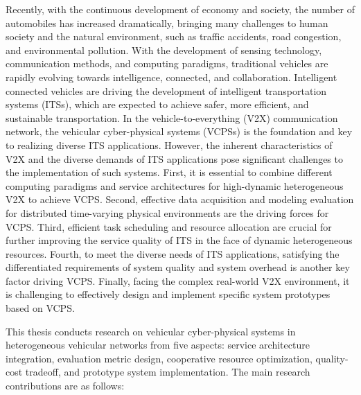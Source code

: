 \begin{eabstract}	%
Recently, with the continuous development of economy and society, the number of automobiles has increased dramatically, bringing many challenges to human society and the natural environment, such as traffic accidents, road congestion, and environmental pollution. 
With the development of sensing technology, communication methods, and computing paradigms, traditional vehicles are rapidly evolving towards intelligence, connected, and collaboration. 
Intelligent connected vehicles are driving the development of intelligent transportation systems (ITSs), which are expected to achieve safer, more efficient, and sustainable transportation.
In the vehicle-to-everything (V2X) communication network, the vehicular cyber-physical systems (VCPSs) is the foundation and key to realizing diverse ITS applications. 
However, the inherent characteristics of V2X and the diverse demands of ITS applications pose significant challenges to the implementation of such systems.
First, it is essential to combine different computing paradigms and service architectures for high-dynamic heterogeneous V2X to achieve VCPS. 
Second, effective data acquisition and modeling evaluation for distributed time-varying physical environments are the driving forces for VCPS. 
Third, efficient task scheduling and resource allocation are crucial for further improving the service quality of ITS in the face of dynamic heterogeneous resources. 
Fourth, to meet the diverse needs of ITS applications, satisfying the differentiated requirements of system quality and system overhead is another key factor driving VCPS. 
Finally, facing the complex real-world V2X environment, it is challenging to effectively design and implement specific system prototypes based on VCPS. 

This thesis conducts research on vehicular cyber-physical systems in heterogeneous vehicular networks from five aspects: service architecture integration, evaluation metric design, cooperative resource optimization, quality-cost tradeoff, and prototype system implementation. 
The main research contributions are as follows:


\end{eabstract}
